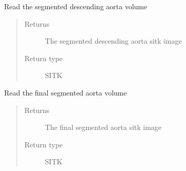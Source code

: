 \documentclass[letterpaper,10pt,english]{sphinxmanual}
\begin{document}

\begin{fulllineitems}
\label{\detokenize{test:test_image_preprocessing.read_desc_volume_image}}
\sphinxAtStartPar
Read the segmented descending aorta volume
\begin{quote}\begin{description}
\item[{Returns}] \leavevmode
\sphinxAtStartPar
The segmented descending aorta sitk image

\item[{Return type}] \leavevmode
\sphinxAtStartPar
SITK

\end{description}\end{quote}

\end{fulllineitems}


\begin{fulllineitems}
\label{\detokenize{test:test_image_preprocessing.read_final_volume_image}}
\sphinxAtStartPar
Read the final segmented aorta volume
\begin{quote}\begin{description}
\item[{Returns}] \leavevmode
\sphinxAtStartPar
The final segmented aorta sitk image

\item[{Return type}] \leavevmode
\sphinxAtStartPar
SITK

\end{description}\end{quote}

\end{fulllineitems}

\end{document}
